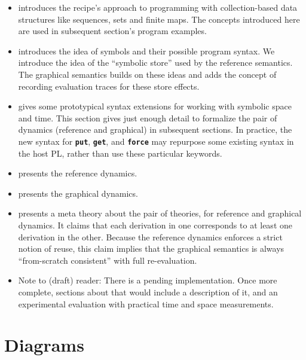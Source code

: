 \documentclass[11pt]{article}
\renewcommand{\ottkw}[1]{\textbf{\texttt{#1}}}
\begin{document}
\begin{itemize}

\item {} introduces the recipe's approach to
  programming with collection-based data structures like sequences,
  sets and finite maps.  The concepts introduced here are used in
  subsequent section's program examples.

\item {} introduces the idea of
  symbols and their possible program syntax.  We introduce the idea of
  the ``symbolic store'' used by the reference semantics.  The
  graphical semantics builds on these ideas and adds the concept of
  recording evaluation traces for these store effects.

\item {} gives some prototypical syntax
  extensions for working with symbolic space and time.
  This section gives just enough detail to
  formalize the pair of dynamics (reference and graphical) in
  subsequent sections.
  In practice,
  the new syntax for \ottkw{put}, \ottkw{get}, and \ottkw{force} may
  repurpose some existing syntax in the host PL, rather than use these
  particular keywords.

\item {} presents the reference dynamics.

\item {} presents the graphical dynamics.

\item {} presents a meta theory
  about the pair of theories, for reference and graphical dynamics.
  It claims that each derivation in one corresponds
  to at least one derivation in the other.  Because the reference
  dynamics enforces a strict notion of reuse, this claim implies that
  the graphical semantics is always ``from-scratch consistent'' with
  full re-evaluation.

\item Note to (draft) reader: There is a pending implementation.  Once more
  complete, sections about that would include a description of it, and
  an experimental evaluation with practical time and space
  measurements.

\end{itemize}

\newpage

\section{Diagrams}
\end{document}
